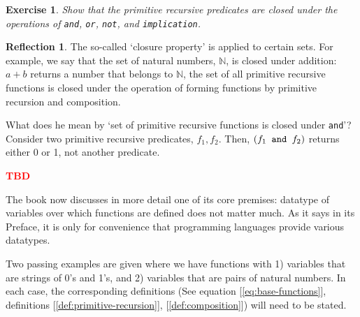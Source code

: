 \documentclass[11pt]{book}
\theoremstyle{definition}
\theoremstyle{plain}
\newtheorem{exercise}{Exercise}[chapter]
\theoremstyle{problemstyle}
\theoremstyle{remark}
\theoremstyle{definition}
\newtheorem{reflection}{Reflection}
\newcommand{\tbd}{
    \vspace{5mm}
    \textbf{\textcolor{red}{\Large{TBD}}}
    \vspace{5mm}
}
\begin{document}
\begin{exercise}
    Show that the primitive recursive predicates are closed under the operations of \texttt{and}, \texttt{or}, \texttt{not}, and \texttt{implication}.
\end{exercise}
\begin{reflection}
    The so-called `closure property' is applied to certain sets. For example, we say that the set of natural numbers, $\mathbb{N}$, is closed under addition: $a+b$ returns a number that belongs to $\mathbb{N}$, the set of all primitive recursive functions is closed under the operation of forming functions by primitive recursion and composition.

    What does he mean by `set of primitive recursive functions is closed under \texttt{and}'? Consider two primitive recursive predicates, $f_1,f_2$. Then, $(f_1\text{\texttt{ and }}f_2)$ returns either 0 or 1, not another predicate.
\end{reflection}

\tbd

The book now discusses in more detail one of its core premises: datatype of variables over which functions are defined does not matter much. As it says in its Preface, it is only for convenience that programming languages provide various datatypes.

Two passing examples are given where we have functions with 1) variables that are strings of 0's and 1's, and 2) variables that are pairs of natural numbers. In each case, the corresponding definitions (See equation [\ref{eq:base-functions}], definitions [\ref{def:primitive-recursion}], [\ref{def:composition}]) will need to be stated.
\end{document}

